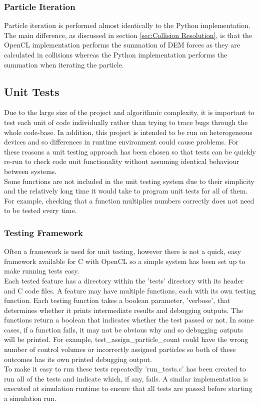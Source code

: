 \documentclass[10pt,a4paper,titlepage]{report}
\begin{document}
\subsubsection{Particle Iteration}
Particle iteration is performed almost identically to the Python implementation. The main difference, as discussed in section \ref{sec:Collision Resolution}, is that the OpenCL implementation performs the summation of DEM forces as they are calculated in collisions whereas the Python implementation performs the summation when iterating the particle.
\subsection{Unit Tests}
Due to the large size of the project and algorithmic complexity, it is important to test each unit of code individually rather than trying to trace bugs through the whole code-base. In addition, this project is intended to be run on heterogeneous devices and so differences in runtime environment could cause problems. For these reasons a unit testing approach has been chosen so that tests can be quickly re-run to check code unit functionality without assuming identical behaviour between systems.
\\Some functions are not included in the unit testing system due to their simplicity and the relatively long time it would take to program unit tests for all of them. For example, checking that a function multiplies numbers correctly does not need to be tested every time.
\subsubsection{Testing Framework}
Often a framework is used for unit testing, however there is not a quick, easy framework available for C with OpenCL so a simple system has been set up to make running tests easy.
\\Each tested feature has a directory within the 'tests' directory with its header and C code files. A feature may have multiple functions, each with its own testing function. Each testing function takes a boolean parameter, 'verbose', that determines whether it prints intermediate results and debugging outputs. The functions return a boolean that indicates whether the test passed or not. In some cases, if a function fails, it may not be obvious why and so debugging outputs will be printed. For example, test\_assign\_particle\_count could have the wrong number of control volumes or incorrectly assigned particles so both of these outcomes has its own printed debugging output. %
\\To make it easy to run these tests repeatedly 'run\_tests.c' has been created to run all of the tests and indicate which, if any, fails. A similar implementation is executed at simulation runtime to ensure that all tests are passed before starting a simulation run.
\end{document}
